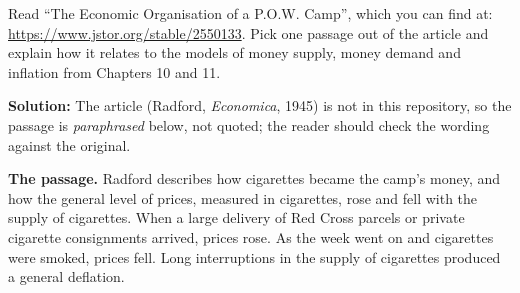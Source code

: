 \documentclass[12pt, letterpaper]{article}
\begin{document}
\begin{tcolorbox}[oddbox,title={Problem 11.9 \quad Money among Prisoners of War}]
\begin{tcolorbox}[questionbox]
Read ``The Economic Organisation of a P.O.W. Camp'', which you can find at:
\url{https://www.jstor.org/stable/2550133}. Pick one passage out of the article and explain how it
relates to the models of money supply, money demand and inflation from Chapters 10 and 11.
\end{tcolorbox}

\textbf{Solution:} The article (Radford, \emph{Economica}, 1945) is not in this repository, so
the passage is \emph{paraphrased} below, not quoted; the reader should check the wording against
the original.

\textbf{The passage.} Radford describes how cigarettes became the camp's money, and how the
general level of prices, measured in cigarettes, rose and fell with the supply of cigarettes.
When a large delivery of Red Cross parcels or private cigarette consignments arrived, prices
rose. As the week went on and cigarettes were smoked, prices fell. Long interruptions in the
supply of cigarettes produced a general deflation.


\end{tcolorbox}
\end{document}
